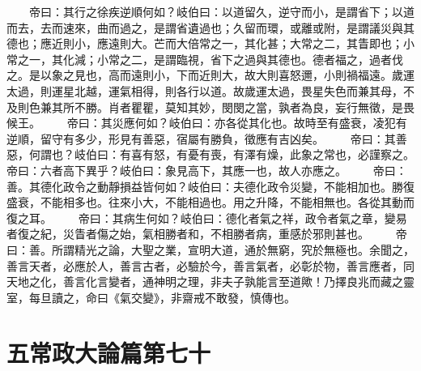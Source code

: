 　　帝曰：其行之徐疾逆順何如？岐伯曰：以道留久，逆守而小，是謂省下；以道而去，去而速來，曲而過之，是謂省遺過也；久留而環，或離或附，是謂議災與其德也；應近則小，應遠則大。芒而大倍常之一，其化甚；大常之二，其眚即也；小常之一，其化減；小常之二，是謂臨視，省下之過與其德也。德者福之，過者伐之。是以象之見也，高而遠則小，下而近則大，故大則喜怒邇，小則禍福遠。歲運太過，則運星北越，運氣相得，則各行以道。故歲運太過，畏星失色而兼其母，不及則色兼其所不勝。肖者瞿瞿，莫知其妙，閔閔之當，孰者為良，妄行無徵，是畏候王。
　　帝曰：其災應何如？岐伯曰：亦各從其化也。故時至有盛衰，凌犯有逆順，留守有多少，形見有善惡，宿屬有勝負，徵應有吉凶矣。
　　帝曰：其善惡，何謂也？岐伯曰：有喜有怒，有憂有喪，有澤有燥，此象之常也，必謹察之。帝曰：六者高下異乎？岐伯曰：象見高下，其應一也，故人亦應之。
　　帝曰：善。其德化政令之動靜損益皆何如？岐伯曰：夫德化政令災變，不能相加也。勝復盛衰，不能相多也。往來小大，不能相過也。用之升降，不能相無也。各從其動而復之耳。
　　帝曰：其病生何如？岐伯曰：德化者氣之祥，政令者氣之章，變易者復之紀，災眚者傷之始，氣相勝者和，不相勝者病，重感於邪則甚也。
　　帝曰：善。所謂精光之論，大聖之業，宣明大道，通於無窮，究於無極也。余聞之，善言天者，必應於人，善言古者，必驗於今，善言氣者，必彰於物，善言應者，同天地之化，善言化言變者，通神明之理，非夫子孰能言至道歟！乃擇良兆而藏之靈室，每旦讀之，命曰《氣交變》，非齋戒不敢發，慎傳也。


\section{五常政大論篇第七十}

